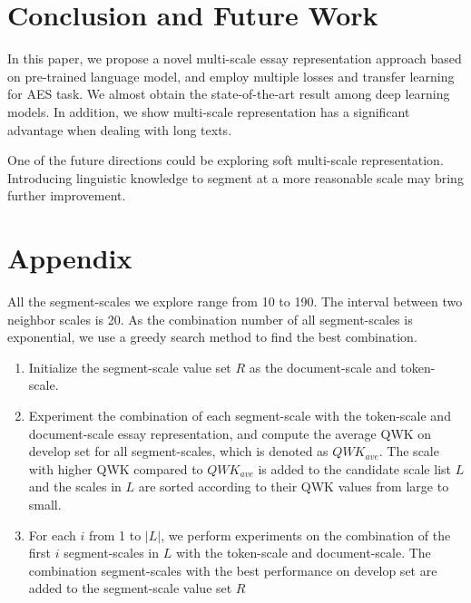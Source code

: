 \documentclass[11pt]{article}
\begin{document}
\section{Conclusion and Future Work}
In this paper, we propose a novel multi-scale essay representation approach based on pre-trained language model, and employ multiple losses and transfer learning for AES task.
We almost obtain the state-of-the-art result among deep learning models.
In addition, we show multi-scale representation has a significant advantage when dealing with long texts.

One of the future directions could be exploring soft multi-scale representation.
Introducing linguistic knowledge to segment at a more reasonable scale may bring further improvement.






\appendix

\section{Appendix}
\label{sec:appendix}

All the segment-scales we explore range from 10 to 190.
The interval between two neighbor scales is 20. As the combination number of all segment-scales is exponential, we use a greedy search method to find the best combination.
\begin{enumerate}
\item Initialize the segment-scale value set $R$ as the document-scale and  token-scale.
\item Experiment the combination of each segment-scale with the token-scale and document-scale essay representation, and compute the average QWK on develop set for all segment-scales, which is denoted as $QWK_{ave}$.
The scale with higher QWK compared to $QWK_{ave}$ is added to the candidate scale list $L$ and the scales in $L$ are sorted according to their QWK values from large to small.
\item For each $i$ from 1 to $|L|$, we perform experiments on the combination of the first $i$ segment-scales in $L$ with the token-scale and document-scale.
The combination segment-scales with the best performance on develop set are added to the segment-scale value set $R$
\end{enumerate}
\end{document}
